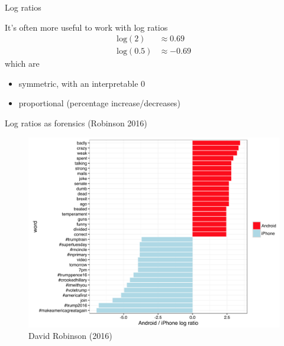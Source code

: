 \documentclass{hertieteaching}
\begin{document}
\begin{frame}{Log ratios}
\protect\hypertarget{log-ratios}{}

It's often more useful to work with log ratios \[
\begin{aligned}
\text{log}(2)   & \approx 0.69\\
\text{log}(0.5) & \approx -0.69
\end{aligned}
\] which are

\begin{itemize}
\item
  symmetric, with an interpretable 0\item
  proportional (percentage increase/decreases)
\end{itemize}

\end{frame}

\begin{frame}{Log ratios as forensics (Robinson 2016)}
\protect\hypertarget{log-ratios-as-forensics}{}

\begin{figure}

{\centering \includegraphics[width=0.6\linewidth]{pictures/trumptweets} 

}

\caption{David Robinson (2016)}\label{fig:unnamed-chunk-9}
\end{figure}

\end{frame}
\end{document}

